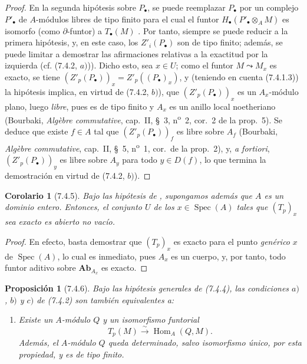 \documentclass[10pt,oneside,openany]{book}
\theoremstyle{egaenv}\newtheorem*{env}{---}
\theoremstyle{egastatement}
\newtheorem*{proposition}{Proposición}
\newtheorem*{corollary}{Corolario}
\theoremstyle{egadescription}
\newcommand{\oldpage}[2][]{\marginnote{\normalfont\scriptsize\textbf{#1}\,|\,#2}\ignorespaces}
\begin{document}
\begin{proof}
En la segunda hipótesis sobre $P_\bullet$, se puede reemplazar $P_\bullet$ por
un complejo $P'_\bullet$ de
\oldpage[III]{188}
$A$-módulos libres de tipo finito para el cual el funtor
$H_\bullet(P'_\bullet\otimes_A M)$ es isomorfo (como $\partial$-funtor) a
$T_\bullet(M)$ . Por tanto, siempre se puede reducir a la
primera hipótesis, y, en este caso, los $Z'_i(P_\bullet)$ son de
tipo finito; además, se puede limitar a demostrar las afirmaciones relativas a
la exactitud por la izquierda (cf. (7.4.2, $a)$)). Dicho esto, sea $x\in U$; como el
funtor $M\leadsto M_x$ es exacto, se tiene
$(Z'_p(P_\bullet))_x=Z'_p((P_\bullet)_x)$,
y (teniendo en cuenta (7.4.1.3)) la hipótesis implica, en virtud de
(7.4.2, $b)$), que $(Z'_p(P_\bullet))_x$ es un $A_x$-módulo plano,
luego \emph{libre}, pues es de tipo finito y $A_x$ es un anillo local noetheriano
(Bourbaki, \emph{Algèbre commutative}, cap.~II, \S~3,
n\textsuperscript{o}~2, cor.~2 de la prop.~5). Se deduce que existe $f\in A$
tal que $(Z'_p(P_\bullet))_f$ es libre sobre $A_f$ (Bourbaki,
\emph{Algèbre commutative}, cap.~II, \S~5, n\textsuperscript{o}~1, cor.~de la
prop.~2), y, \emph{a fortiori}, $(Z'_p(P_\bullet))_y$ es libre sobre $A_y$ para
todo $y\in D(f)$, lo
que termina la demostración en virtud de (7.4.2, $b)$).
\end{proof}

\begin{corollary}[7.4.5]
\label{III.7.4.5}
Bajo las hipótesis de , supongamos además que $A$ es un
dominio entero.
Entonces, el conjunto $U$ de los $x\in\operatorname{Spec}(A)$ tales que $(T_p)_x$ sea
exacto es abierto no vacío.
\end{corollary}

\begin{proof}
En efecto, basta demostrar que $(T_p)_x$ es exacto para el punto \emph{genérico} $x$
de $\operatorname{Spec}(A)$, lo cual es inmediato, pues $A_x$ es un cuerpo, y, por tanto,
todo funtor aditivo sobre $\boldsymbol{Ab}_{A_x}$ es exacto.
\end{proof}

\begin{proposition}[7.4.6]
Bajo las hipótesis generales de \textup{(7.4.4)}, las condiciones $a)$, $b)$ y $c)$ \textup{de
(7.4.2)} son también equivalentes a:
\begin{enumerate}
  \item[d)] Existe un $A$-módulo $Q$ y un isomorfismo funtorial
    \[
      T_p(M)\xrightarrow{\sim}\operatorname{Hom}_A(Q,M).
      \tag{7.4.6.1}\label{III.7.4.6.1.fr}
    \]
    Además, el $A$-módulo $Q$ queda determinado, salvo isomorfismo único, por
    esta propiedad, y es de tipo finito.
\end{enumerate}
\end{proposition}
\end{document}
